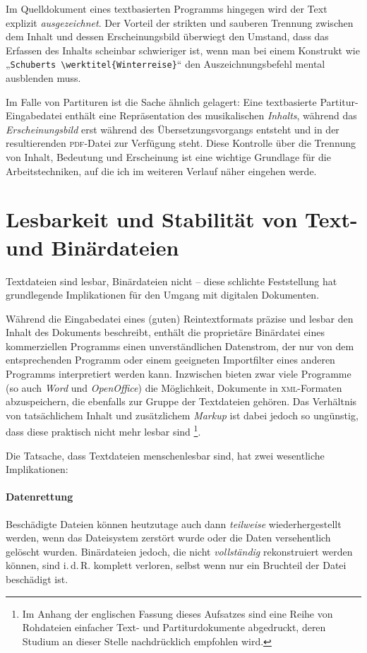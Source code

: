 \documentclass[DIV=12]{scrreprt}
\begin{document}
Im Quelldokument eines textbasierten Programms hingegen wird der Text explizit \emph{ausgezeichnet}.
Der Vorteil der strikten und sauberen Trennung zwischen dem Inhalt und dessen Erscheinungsbild überwiegt den Umstand, dass das Erfassen des Inhalts scheinbar schwieriger ist, wenn man bei einem Konstrukt wie „\texttt{Schuberts \textbackslash werktitel\{Winterreise\}}“ den Auszeichnungsbefehl mental ausblenden muss.

Im Falle von Partituren ist die Sache ähnlich gelagert:
Eine textbasierte Partitur-Eingabedatei enthält eine Repräsentation des musikalischen \emph{Inhalts}, während das \emph{Erscheinungsbild} erst während des Übersetzungsvorgangs entsteht und in der resultierenden \textsc{pdf}-Datei zur Verfügung steht.
Diese Kontrolle über die Trennung von Inhalt, Bedeutung und Erscheinung ist eine wichtige Grundlage für die Arbeitstechniken, auf die ich im weiteren Verlauf näher eingehen werde.

\section{Lesbarkeit und Stabilität von Text- und Binärdateien}
\label{sec:pt_readability-stability}
Textdateien sind lesbar, Binärdateien nicht -- diese schlichte Feststellung hat grundlegende Implikationen für den Umgang mit digitalen Dokumenten.

Während die Eingabedatei eines (guten) Reintextformats präzise und lesbar den Inhalt des Dokuments beschreibt, enthält die proprietäre Binärdatei eines kommerziellen Programms einen unverständlichen Datenstrom, der nur von dem entsprechenden Programm oder einem geeigneten Importfilter eines anderen Programms interpretiert werden kann.
Inzwischen bieten zwar viele Programme (so auch \emph{Word} und \emph{OpenOffice}) die Möglichkeit, Dokumente in \textsc{xml}-Formaten abzuspeichern, die ebenfalls zur Gruppe der Textdateien gehören.
Das Verhältnis von tatsächlichem Inhalt und zusätzlichem \emph{Markup} ist dabei jedoch so ungünstig, dass diese praktisch nicht mehr lesbar sind%
\footnote{Im Anhang der englischen Fassung dieses Aufsatzes sind eine Reihe von Rohdateien einfacher Text- und Partiturdokumente abgedruckt, deren Studium an dieser Stelle nachdrücklich empfohlen wird.}.

Die Tatsache, dass Textdateien menschenlesbar sind, hat zwei wesentliche Implikationen:

\paragraph{Datenrettung}
Beschädigte Dateien können heutzutage auch dann \emph{teilweise} wiederhergestellt werden, wenn das Dateisystem zerstört wurde oder die Daten versehentlich gelöscht wurden.
Binärdateien jedoch, die nicht \emph{vollständig} rekonstruiert werden können, sind i.\,d.\,R. komplett verloren, selbst wenn nur ein Bruchteil der Datei beschädigt ist.
\end{document}
